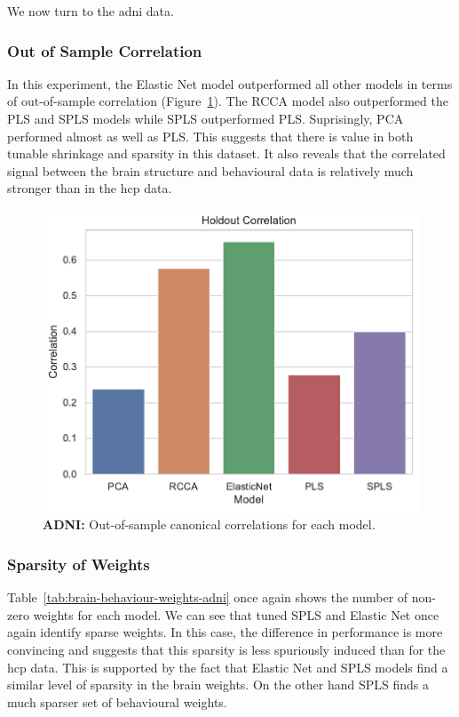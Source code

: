 We now turn to the \acrshort{adni} data.

\subsubsection{Out of Sample Correlation}

In this experiment, the Elastic Net model outperformed all other models in terms of out-of-sample correlation (Figure~\ref{fig:performance}).
The RCCA model also outperformed the PLS and SPLS models while SPLS outperformed PLS.
Suprisingly, PCA performed almost as well as PLS.
This suggests that there is value in both tunable shrinkage and sparsity in this dataset.
It also reveals that the correlated signal between the brain structure and behavioural data is relatively much stronger than in the \acrshort{hcp} data.

\begin{figure}
    \centering
    \includegraphics[width=0.5\linewidth]{figures/adni/holdout_correlations}
    \caption{\textbf{ADNI:} Out-of-sample canonical correlations for each model.}\label{fig:performance}
\end{figure}

\subsubsection{Sparsity of Weights}

Table~\ref{tab:brain-behaviour-weights-adni} once again shows the number of non-zero \gls{weights} for each model.
We can see that tuned SPLS and Elastic Net once again identify sparse weights.
In this case, the difference in performance is more convincing and suggests that this sparsity is less spuriously induced than for the \acrshort{hcp} data.
This is supported by the fact that Elastic Net and SPLS models find a similar level of sparsity in the brain weights.
On the other hand SPLS finds a much sparser set of behavioural weights.

